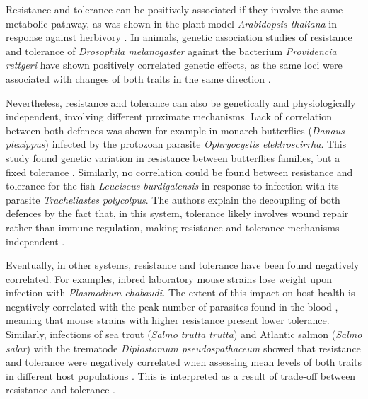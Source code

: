 Resistance and tolerance can be positively associated if they involve the same metabolic pathway, as was shown in the plant model \textit{Arabidopsis thaliana} in response against herbivory \citep{mesa_molecular_2017}. In animals, genetic association studies of resistance and tolerance of \textit{Drosophila melanogaster} against the bacterium \textit{Providencia rettgeri} have shown positively correlated genetic effects, as the same loci were associated with changes of both traits in the same direction \citep{howick_genetic_2017}.\par

Nevertheless, resistance and tolerance can also be genetically and physiologically independent, involving different proximate mechanisms. Lack of correlation between both defences was shown for example in monarch butterflies (\textit{Danaus plexippus}) infected by the protozoan parasite \textit{Ophryocystis elektroscirrha}. This study found genetic variation in resistance between butterflies families, but a fixed tolerance \citep{Lefvre2010}. Similarly, no correlation could be found between resistance and tolerance for the fish \textit{Leuciscus burdigalensis} in response to infection with its parasite \textit{Tracheliastes polycolpus}. The authors explain the decoupling of both defences by the fact that, in this system, tolerance likely involves wound repair rather than immune regulation, making resistance and tolerance mechanisms independent \citep{MazGuilmo2014}.\par

Eventually, in other systems, resistance and tolerance have been found negatively correlated. For examples, inbred laboratory mouse strains lose weight upon infection with \textit{Plasmodium chabaudi.} The extent of this impact on host health is negatively correlated with the peak number of parasites found in the blood \citep{raaberg_disentangling_2007}, meaning that mouse strains with higher resistance present lower tolerance. Similarly, infections of sea trout (\textit{Salmo trutta trutta}) and Atlantic salmon (\textit{Salmo salar}) with the trematode \textit{Diplostomum pseudospathaceum} showed that resistance and tolerance were negatively correlated when assessing mean levels of both traits in different host populations \citep{klemme_vertebrate_2016}. This is interpreted as a result of trade-off between resistance and tolerance \citep{sheldon_ecological_1996, restif_concurrent_2004, raaberg_decomposing_2009}.\par

